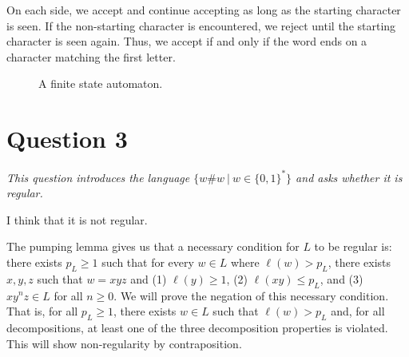 \documentclass[a4paper]{article}
\begin{document}
On each side, we accept and continue accepting as long as the starting character
is seen. If the non-starting character is encountered, we reject until the starting
character is seen again.
Thus, we accept if and only if the word ends on a character matching the first letter. 

\begin{figure}[h]
  \begin{center}
  \end{center}
  \caption{A finite state automaton.}\label{fig:2b}
\end{figure}

\section*{Question 3}
\begin{center}
  \textit{
    This question introduces the language $\big\{w\#w~\big|~w \in \{0,1\}^*\big\}$
    and asks whether it is regular.
  }
\end{center}
I think that it is not regular.

The pumping lemma gives us that a necessary condition for $L$
to be regular is: there exists $p_L \ge 1$ such that for every $w \in L$
where $\ell(w) > p_L$, there exists $x,y,z$ such that $w = xyz$ and 
(1) $\ell(y) \ge 1$, (2) $\ell(xy) \le p_L$, and (3) $xy^nz \in L$ for all $n \ge 0$.
We will prove the negation of this necessary condition.
%
That is,
for all $p_L \ge 1$,
there exists $w \in L$ such that $\ell(w) > p_L$ and,
for all decompositions,
at least one of the three decomposition properties
is violated.
This will show non-regularity by contraposition.
\end{document}
